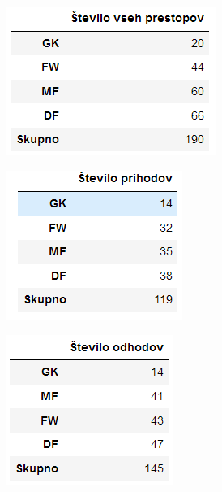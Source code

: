 \documentclass[a4paper, 12pt]{article}
\begin{document}
\begin{minipage}[t]{0.33\textwidth}
\includegraphics{tabela5}
\label{fig:tabela5}
\end{minipage}
\hfill
\begin{minipage}[t]{0.32\textwidth}
\includegraphics{tabela6}
\label{fig:tabela6}
\end{minipage}
\hfill
\begin{minipage}[t]{0.32\textwidth}
\includegraphics{tabela7}
\label{fig:tabela7}
\end{minipage} 


\end{document}

